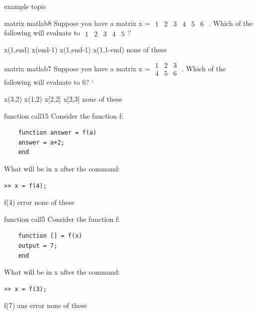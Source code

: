\documentclass{exam}
\begin{document}
\begin{blo}{example topic}
\begin{problem}[requires=matrix matlab]{matrix matlab}{8}
  Suppose you have a matrix x = \footnotesize
  $\begin{array}{cccccc}1 & 2 & 3 & 4 & 5 & 6 \end{array}$
  \normalsize. Which of the following will evaluate to \footnotesize
  $\begin{array}{cccccc}1 & 2 & 3 & 4 & 5 \end{array}$\normalsize?
  \begin{answers}   
    \answer x(1,end)  
    \answer x(end-1)  
    \answer[correct] x(1,end-1) %
    \answer x(1,1-end)
    \answer[fixed] none of these %
  \end{answers}
\end{problem}

\begin{problem}[requires=matrix matlab]{matrix matlab}{7}
  Suppose you have a matrix x = \footnotesize
  $\begin{array}{ccc}1 & 2 & 3 \\4 & 5 & 6 \end{array}$
  \normalsize. Which of the following will evaluate to 6?
`  \begin{answers}   
    \answer x(3,2)
    \answer x(1,2)
    \answer x[2,2]
    \answer x[2,3] 
     none of these %
  \end{answers}
\end{problem}

\begin{problem}{function call}{15}
  Consider the function f:
  \begin{verbatim}
    function answer = f(a)
    answer = a+2;
    end
  \end{verbatim}
  What will be in x after the command:
  \begin{verbatim}>> x = f(4);
  \end{verbatim}
  \begin{answers}
    \answer f(4)
    \answer[fixed] error %
    \answer[fixed] none of these %
  \end{answers}
\end{problem}

\begin{problem}{function call}{5}
  Consider the function f:
  \begin{verbatim}
    function [] = f(x)
    output = 7;
    end
  \end{verbatim}
  What will be in x after the command:
  \begin{verbatim}>> x = f(3);\end{verbatim}
  \begin{answers}
    \answer f(7)
    \answer ans
     error %
    \answer[fixed] none of these %
  \end{answers}
\end{problem}


\end{blo}
\end{document}
